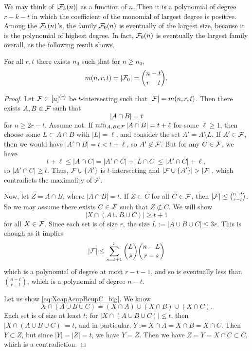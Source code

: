 We may think of $|\mathcal{F}_k(n)|$ as a function of $n$. Then it is a polynomial of degree $r-k-t$ in which the coefficient of the monomial of largest degree is positive. Among the $\mathcal{F}_k(n)$'s, the family $\mathcal{F}_0(n)$ is eventually of the largest size, because it is the polynomial of highest degree. In fact, $\mathcal{F}_0(n)$ is eventually the largest family overall, as the following result shows.
\begin{theorem} \label{thm:F0max}
For all $r,t$ there exists $n_0$ such that for $n\geq n_0$,
\[
m(n,r,t) = |\mathcal{F}_0| = {n-t \choose r-t}.
\]
\end{theorem}
\begin{proof}	
Let $\mathcal{F}\subset [n]^{(r)}$ be $t$-intersecting such that $|\mathcal{F}| = m(n,r,t)$. Then there exists $A,B\in \mathcal{F}$ such that
\[
|A\cap B| = t
\]
for $n\geq 2r-t$. Assume not. If $\min_{A,B\in \mathcal{F}} |A\cap B| = t+\ell$ for some $\ell\geq 1$, then choose some  $L\subset A\cap B$ with $|L|=\ell$, and consider the set $A'=A\setminus L$. If $A'\in \mathcal{F}$, then we would have $|A'\cap B|=t < t+\ell$, so $A'\not \in \mathcal{F}$. But for any $C\in \mathcal{F}$, we have
\[
t+\ell \leq |A\cap C| = |A'\cap C| + |L\cap C| \leq |A'\cap C| +\ell,
\]
so $|A'\cap C|\geq t$. Thus, $\mathcal{F}\cup \{A'\}$ is $t$-intersecting and $|\mathcal{F}\cup \{A'\}| > |\mathcal{F}|$, which contradicts the maximality of $\mathcal{F}$.

Now, let $Z=A\cap B$, where $|A\cap B|=t$. If $Z\subset C$ for all $C\in \mathcal{F}$, then $|\mathcal{F}| \leq {n-t \choose r-t}$. So we may assume there exists $C\in \mathcal{F}$ such that $Z\not \subset C$. We will show 
\begin{equation}	\label{eq:XcapAcupBcupC_big} \tag{$\star$}
 |X \cap (A\cup B\cup C)|\geq t+1
 \end{equation} for all $X\in \mathcal{F}$. Since each set is of size $r$, the size $L:=|A\cup B\cup C| \leq 3r$. This is enough as it implies
\[
|\mathcal{F}| \leq \sum_{s=t+1}^r {L \choose s} {n-L \choose r-s}
\]
which is a polynomial of degree at most $r-t-1$, and so is eventually less than ${n-t\choose r-t}$, which is a polynomial of degree $n-t$. 

Let us show \eqref{eq:XcapAcupBcupC_big}. We know
\[
X\cap (A\cup B\cup C) = (X\cap A)\cup (X\cap B)\cup (X\cap C).
\]
Each set is of size at least $t$; for $|X\cap (A\cup B\cup C)|\leq t$, then $|X\cap (A\cup B\cup C)| = t$, and in particular,  $Y:=X\cap A= X\cap B = X\cap C$. Then $Y\subset Z$, but since $|Y| = |Z| = t$, we have $Y=Z$. Then we have $Z=Y = X\cap C \subset C$, which is a contradiction.
\end{proof}

